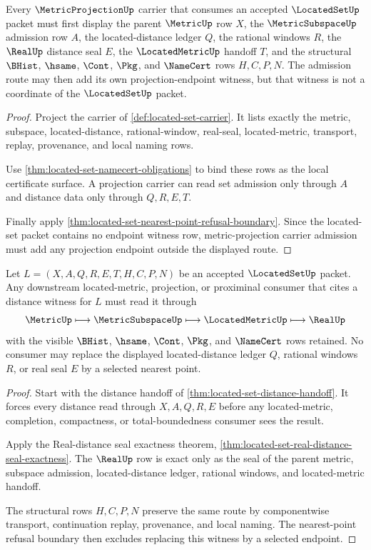 \begin{theorem}
\label{thm:locatedset-metric-projection-carrier-admission}
Every $\MetricProjectionUp$ carrier that consumes an accepted $\LocatedSetUp$ packet must first display the parent $\MetricUp$ row $X$, the $\MetricSubspaceUp$ admission row $A$, the located-distance ledger $Q$, the rational windows $R$, the $\RealUp$ distance seal $E$, the $\LocatedMetricUp$ handoff $T$, and the structural $\BHist$, $\hsame$, $\Cont$, $\Pkg$, and $\NameCert$ rows $H,C,P,N$. The admission route may then add its own projection-endpoint witness, but that witness is not a coordinate of the $\LocatedSetUp$ packet.
\end{theorem}
\begin{proof}
Project the carrier of \autoref{def:located-set-carrier}. It lists exactly the metric, subspace, located-distance, rational-window, real-seal, located-metric, transport, replay, provenance, and local naming rows.

Use \autoref{thm:located-set-namecert-obligations} to bind these rows as the local certificate surface. A projection carrier can read set admission only through $A$ and distance data only through $Q,R,E,T$.

Finally apply \autoref{thm:located-set-nearest-point-refusal-boundary}. Since the located-set packet contains no endpoint witness row, metric-projection carrier admission must add any projection endpoint outside the displayed route.
\end{proof}

\begin{theorem}
\label{thm:locatedset-distance-witness-obligation}
Let $L=(X,A,Q,R,E,T,H,C,P,N)$ be an accepted $\LocatedSetUp$ packet. Any downstream located-metric, projection, or proximinal consumer that cites a distance witness for $L$ must read it through
$$
\MetricUp \longmapsto \MetricSubspaceUp \longmapsto \LocatedMetricUp \longmapsto \RealUp
$$
with the visible $\BHist$, $\hsame$, $\Cont$, $\Pkg$, and $\NameCert$ rows retained. No consumer may replace the displayed located-distance ledger $Q$, rational windows $R$, or real seal $E$ by a selected nearest point.
\end{theorem}
\begin{proof}
Start with the distance handoff of \autoref{thm:located-set-distance-handoff}. It forces every distance read through $X,A,Q,R,E$ before any located-metric, completion, compactness, or total-boundedness consumer sees the result.

Apply the Real-distance seal exactness theorem, \autoref{thm:located-set-real-distance-seal-exactness}. The $\RealUp$ row is exact only as the seal of the parent metric, subspace admission, located-distance ledger, rational windows, and located-metric handoff.

The structural rows $H,C,P,N$ preserve the same route by componentwise transport, continuation replay, provenance, and local naming. The nearest-point refusal boundary then excludes replacing this witness by a selected endpoint.
\end{proof}

